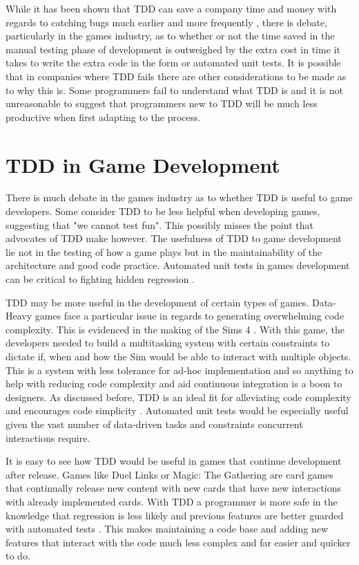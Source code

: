 \documentclass{scrartcl}
\begin{document}
While it has been shown that TDD can save a company time and money with regards to catching bugs much earlier and more frequently \cite{kayongo2016software} \cite{GDCBackwards}, there is debate, particularly in the games industry, as to whether or not the time saved in the manual testing phase of development is outweighed by the extra cost in time it takes to write the extra code in the form or automated unit tests. It is possible that in companies where TDD fails there are other considerations to be made as to why this is. Some programmers fail to understand what TDD is \cite{janzen2008does} and it is not unreasonable to suggest that programmers new to TDD will be much less productive when first adapting to the process. 


\section{TDD in Game Development}

There is much debate in the games industry as to whether TDD is useful to game developers. Some consider TDD to be less helpful when developing games, suggesting that "we cannot test fun". This possibly misses the point that advocates of TDD make however. The usefulness of TDD to game development lie not in the testing of how a game plays but in the maintainability of the architecture and good code practice. Automated unit tests in games development can be critical to fighting hidden regression \cite{GamaEmbracingFun}.

TDD may be more useful in the development of certain types of games. Data-Heavy games face a particular issue in regards to generating overwhelming code complexity. This is evidenced in the making of the Sims 4 \cite{GDCConcurrent}. With this game, the developers needed to build a multitasking system with certain constraints to dictate if, when and how the Sim would be able to interact with multiple objects. This is a system with less tolerance for ad-hoc implementation and so anything to help with reducing code complexity and aid continuous integration is a boon to designers.  As discussed before, TDD is an ideal fit for alleviating code complexity and encourages code simplicity \cite{amrit2017effectiveness}. Automated unit tests would be especially useful given the vast number of data-driven tasks and constraints concurrent interactions require. 

It is easy to see how TDD would be useful in games that continue development after release. Games like Duel Links or Magic: The Gathering are card games that continually release new content with new cards that have new interactions with already implemented cards. With TDD a programmer is more safe in the knowledge that regression is less likely and previous features are better guarded with automated tests \cite{GDCBackwards}. This makes maintaining a code base and adding new features that interact with the code much less complex and far easier and quicker to do.
\end{document}
